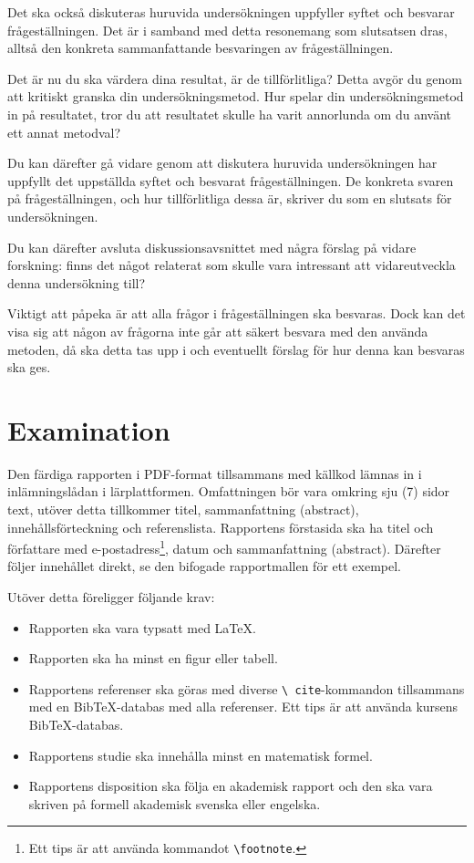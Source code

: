 \documentclass[a4paper]{miunasgn}
\begin{document}
Det ska också diskuteras huruvida undersökningen uppfyller syftet och besvarar 
frågeställningen.
Det är i samband med detta resonemang som slutsatsen dras, alltså den konkreta 
sammanfattande besvaringen av frågeställningen.

Det är nu du ska värdera dina resultat, är de tillförlitliga?
Detta avgör du genom att kritiskt granska din undersökningsmetod.
Hur spelar din undersökningsmetod in på resultatet, tror du att resultatet 
skulle ha varit annorlunda om du använt ett annat metodval?

Du kan därefter gå vidare genom att diskutera huruvida undersökningen har 
uppfyllt det uppställda syftet och besvarat frågeställningen.
De konkreta svaren på frågeställningen, och hur tillförlitliga dessa är, 
skriver du som en slutsats för undersökningen.

Du kan därefter avsluta diskussionsavsnittet med några förslag på vidare 
forskning: finns det något relaterat som skulle vara intressant att 
vidareutveckla denna undersökning till?

Viktigt att påpeka är att alla frågor i frågeställningen ska besvaras.
Dock kan det visa sig att någon av frågorna inte går att säkert besvara med den 
använda metoden, då ska detta tas upp i och eventuellt förslag för hur denna 
kan besvaras ska ges.


\section{Examination}

Den färdiga rapporten i PDF-format tillsammans med källkod lämnas in 
i inlämningslådan i lärplattformen.
Omfattningen bör vara omkring sju (7) sidor text, utöver detta tillkommer 
titel, sammanfattning (abstract), innehållsförteckning och referenslista.
Rapportens förstasida ska ha titel och författare med e-postadress\footnote{%
  Ett tips är att använda kommandot \texttt{\textbackslash footnote}.
}, datum och sammanfattning (abstract).
Därefter följer innehållet direkt, se den bifogade rapportmallen för ett 
exempel.

Utöver detta föreligger följande krav:
\begin{itemize}
  \item Rapporten ska vara typsatt med LaTeX.
  \item Rapporten ska ha minst en figur eller tabell.
  \item Rapportens referenser ska göras med diverse \texttt{\textbackslash 
    cite}-kommandon tillsammans med en BibTeX-databas med alla referenser.
    Ett tips är att använda kursens BibTeX-databas.
  \item Rapportens studie ska innehålla minst en matematisk formel.
  \item Rapportens disposition ska följa en akademisk rapport och den ska vara 
    skriven på formell akademisk svenska eller engelska.
\end{itemize}
\end{document}
